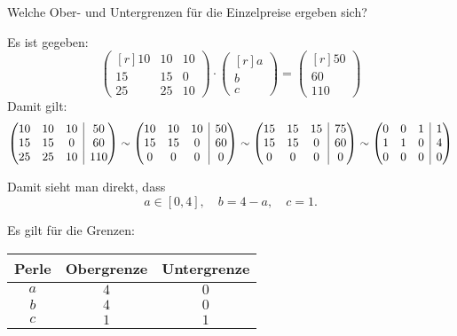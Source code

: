 \documentclass[answers]{exam}
\makeatletter
\newenvironment{sysmatrix}[1]
  {\left(\begin{array}{@{}#1@{}}}
  {\end{array}\right)}
\newcommand{\interval}[1]{\left[ #1 \right]}
\newcommand{\vektor}[1]{\begin{pmatrix*}[r] #1 \end{pmatrix*}}
\makeatother
\begin{document}
\begin{questions}
    Welche Ober- und Untergrenzen für die Einzelpreise ergeben sich?
    \begin{solution}
        Es ist gegeben:
        $$
            \vektor{10 & 10 & 10 \\ 15 & 15 & 0 \\ 25 & 25 & 10} \cdot \vektor{a \\ b \\ c} = \vektor{50 \\ 60 \\ 110}
        $$
        Damit gilt:
        $$
            \begin{sysmatrix}{ccc|c}
                10 & 10 & 10 & 50 \\
                15 & 15 & 0 & 60 \\
                25 & 25 & 10 & 110
            \end{sysmatrix}
            \sim
            \begin{sysmatrix}{ccc|c}
                10 & 10 & 10 & 50 \\
                15 & 15 & 0 & 60 \\
                0 & 0 & 0 & 0
            \end{sysmatrix}
            \sim
            \begin{sysmatrix}{ccc|c}
                15 & 15 & 15 & 75 \\
                15 & 15 & 0 & 60 \\
                0 & 0 & 0 & 0
            \end{sysmatrix}
            \sim
            \begin{sysmatrix}{ccc|c}
                0 & 0 & 1 & 1 \\
                1 & 1 & 0 & 4 \\
                0 & 0 & 0 & 0
            \end{sysmatrix}
        $$

        Damit sieht man direkt, dass
        $$
            a \in \interval{0, 4}, \quad b = 4-a, \quad c = 1.
        $$

        Es gilt für die Grenzen:

        \begin{tabular}{c||c|c}
            Perle & Obergrenze & Untergrenze \\
            \hline
            $a$   & $4$        & $0$         \\
            $b$   & $4$        & $0$         \\
            $c$   & $1$        & $1$
        \end{tabular}
    \end{solution}


\end{questions}
\end{document}
